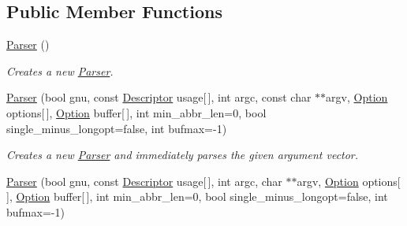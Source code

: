 \subsection*{Public Member Functions}
\begin{DoxyCompactItemize}
\item 
\hypertarget{classxmem_1_1config_1_1third__party_1_1_parser_ad88ba9ed583f79c279e84e823ab3864f}{}\hyperlink{classxmem_1_1config_1_1third__party_1_1_parser_ad88ba9ed583f79c279e84e823ab3864f}{Parser} ()\label{classxmem_1_1config_1_1third__party_1_1_parser_ad88ba9ed583f79c279e84e823ab3864f}

\begin{DoxyCompactList}\small\item\em Creates a new \hyperlink{classxmem_1_1config_1_1third__party_1_1_parser}{Parser}. \end{DoxyCompactList}\item 
\hyperlink{classxmem_1_1config_1_1third__party_1_1_parser_ab6131802b5bacfb921963abd183b5c85}{Parser} (bool gnu, const \hyperlink{structxmem_1_1config_1_1third__party_1_1_descriptor}{Descriptor} usage\mbox{[}$\,$\mbox{]}, int argc, const char $\ast$$\ast$argv, \hyperlink{classxmem_1_1config_1_1third__party_1_1_option}{Option} options\mbox{[}$\,$\mbox{]}, \hyperlink{classxmem_1_1config_1_1third__party_1_1_option}{Option} buffer\mbox{[}$\,$\mbox{]}, int min\+\_\+abbr\+\_\+len=0, bool single\+\_\+minus\+\_\+longopt=false, int bufmax=-\/1)
\begin{DoxyCompactList}\small\item\em Creates a new \hyperlink{classxmem_1_1config_1_1third__party_1_1_parser}{Parser} and immediately parses the given argument vector. \end{DoxyCompactList}\item 
\hypertarget{classxmem_1_1config_1_1third__party_1_1_parser_ae9669add72032bffff977e904b69f70a}{}\hyperlink{classxmem_1_1config_1_1third__party_1_1_parser_ae9669add72032bffff977e904b69f70a}{Parser} (bool gnu, const \hyperlink{structxmem_1_1config_1_1third__party_1_1_descriptor}{Descriptor} usage\mbox{[}$\,$\mbox{]}, int argc, char $\ast$$\ast$argv, \hyperlink{classxmem_1_1config_1_1third__party_1_1_option}{Option} options\mbox{[}$\,$\mbox{]}, \hyperlink{classxmem_1_1config_1_1third__party_1_1_option}{Option} buffer\mbox{[}$\,$\mbox{]}, int min\+\_\+abbr\+\_\+len=0, bool single\+\_\+minus\+\_\+longopt=false, int bufmax=-\/1)\label{classxmem_1_1config_1_1third__party_1_1_parser_ae9669add72032bffff977e904b69f70a}


\end{DoxyCompactItemize}
